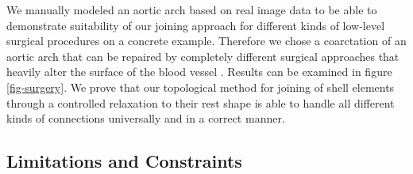 We manually modeled an aortic arch based on real image data to be able to demonstrate suitability of our joining approach for different kinds of low-level surgical procedures on a concrete example. Therefore we chose a coarctation of an aortic arch that can be repaired by completely different surgical approaches that heavily alter the surface of the blood vessel \cite{Dodge2000}. Results can be examined in figure \ref{fig-surgery}. We prove that our topological method for joining of shell elements through a controlled relaxation to their rest shape is able to handle all different kinds of connections universally and in a correct manner.

\subsection{Limitations and Constraints}

